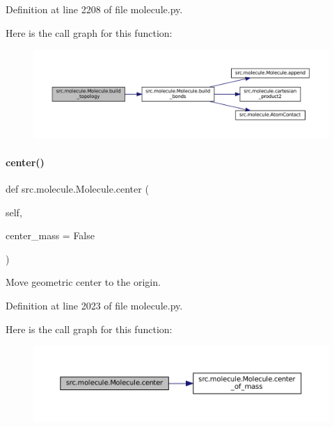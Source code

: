Definition at line 2208 of file molecule.\+py.

Here is the call graph for this function\+:
\nopagebreak
\begin{figure}[H]
\begin{center}
\leavevmode
\includegraphics[width=350pt]{classsrc_1_1molecule_1_1Molecule_afae2c34b572e137801c8077f4267b247_cgraph}
\end{center}
\end{figure}
\mbox{\label{classsrc_1_1molecule_1_1Molecule_a3a4d580584a25a74ec835bf6b09ded81}} 
\paragraph{\texorpdfstring{center()}{center()}}
{\footnotesize\ttfamily def src.\+molecule.\+Molecule.\+center (\begin{DoxyParamCaption}\item[{}]{self,  }\item[{}]{center\+\_\+mass = {\ttfamily False} }\end{DoxyParamCaption})}



Move geometric center to the origin. 



Definition at line 2023 of file molecule.\+py.

Here is the call graph for this function\+:
\nopagebreak
\begin{figure}[H]
\begin{center}
\leavevmode
\includegraphics[width=350pt]{classsrc_1_1molecule_1_1Molecule_a3a4d580584a25a74ec835bf6b09ded81_cgraph}
\end{center}
\end{figure}
\mbox{\label{classsrc_1_1molecule_1_1Molecule_abd4e9ae70858f3f3d522ae6149236697}} 
